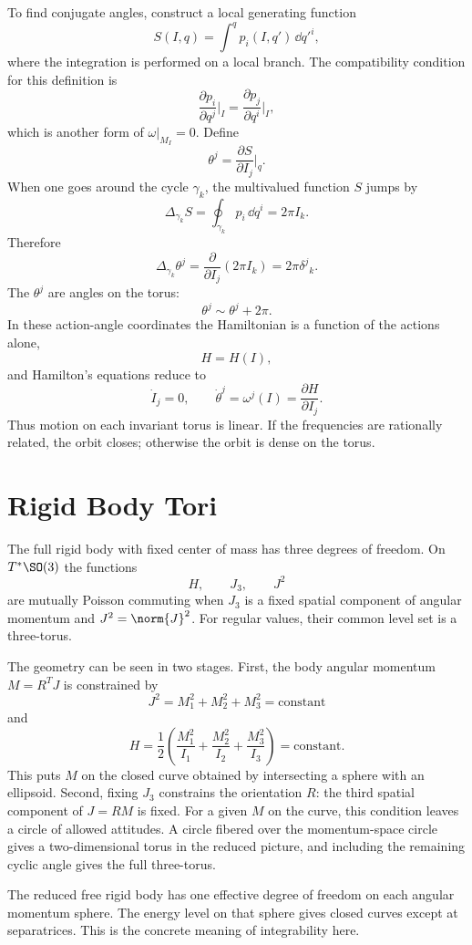 To find conjugate angles, construct a local generating function
\[
  S(I,q)
  =
  \int^q p_i(I,q')\,\dd q'^i,
\]
where the integration is performed on a local branch. The compatibility
condition for this definition is
\[
  \frac{\partial p_i}{\partial q^j}\bigg|_I
  =
  \frac{\partial p_j}{\partial q^i}\bigg|_I,
\]
which is another form of \(\omega|_{M_I}=0\). Define
\[
  \theta^j=\frac{\partial S}{\partial I_j}\bigg|_q.
\]
When one goes around the cycle \(\gamma_k\), the multivalued function \(S\)
jumps by
\[
  \Delta_{\gamma_k}S=\oint_{\gamma_k}p_i\,\dd q^i=2\pi I_k.
\]
Therefore
\[
  \Delta_{\gamma_k}\theta^j
  =
  \frac{\partial}{\partial I_j}(2\pi I_k)
  =
  2\pi\delta^j{}_k.
\]
The \(\theta^j\) are angles on the torus:
\[
  \theta^j\sim \theta^j+2\pi.
\]
In these action-angle coordinates the Hamiltonian is a function of the actions
alone,
\[
  H=H(I),
\]
and Hamilton's equations reduce to
\[
  \dot I_j=0,\qquad
  \dot\theta^j=\omega^j(I)=\frac{\partial H}{\partial I_j}.
\]
Thus motion on each invariant torus is linear. If the frequencies are rationally
related, the orbit closes; otherwise the orbit is dense on the torus.

\section{Rigid Body Tori}
\label{sec:rigid-body-tori}

The full rigid body with fixed center of mass has three degrees of freedom. On
\(T^*\SO(3)\) the functions
\[
  H,\qquad J_3,\qquad J^2
\]
are mutually Poisson commuting when \(J_3\) is a fixed spatial component of
angular momentum and \(J^2=\norm{J}^2\). For regular values, their common level
set is a three-torus.

The geometry can be seen in two stages. First, the body angular momentum
\(M=R^TJ\) is constrained by
\[
  J^2=M_1^2+M_2^2+M_3^2=\text{constant}
\]
and
\[
  H=\frac12\left(\frac{M_1^2}{I_1}
  +\frac{M_2^2}{I_2}
  +\frac{M_3^2}{I_3}\right)=\text{constant}.
\]
This puts \(M\) on the closed curve obtained by intersecting a sphere with an
ellipsoid. Second, fixing \(J_3\) constrains the orientation \(R\): the third
spatial component of \(J=RM\) is fixed. For a given \(M\) on the curve, this
condition leaves a circle of allowed attitudes. A circle fibered over the
momentum-space circle gives a two-dimensional torus in the reduced picture, and
including the remaining cyclic angle gives the full three-torus.

The reduced free rigid body has one effective degree of freedom on each angular
momentum sphere. The energy level on that sphere gives closed curves except at
separatrices. This is the concrete meaning of integrability here.

